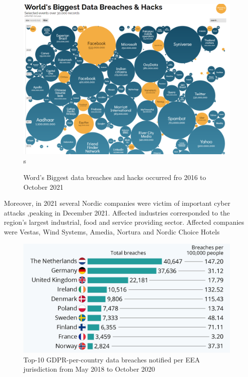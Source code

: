 \begin{figure}[h]
\includegraphics[width=15cm]{img/DataBreach.png}
s\caption{Word's Biggest data breaches and hacks occurred fro 2016 to October 2021  \cite{WorldDataBreach:online}}
\label{fig:worldDataBreach}
\end{figure}
Moreover, in 2021 several Nordic companies were victim of important cyber attacks ,peaking in December 2021\cite{Nordicco81:online}. Affected industries corresponded to the region’s largest industrial, food and  service providing sector.
Affected companies were Vestas, Wind Systems, Amedia, Nortura
and Nordic Choice Hotels

\begin{figure}[h]
\includegraphics[width=15cm]{img/GDPRDataBreach.jpeg}
\centering
\caption{Top-10 \ac{GDPR}-per-country data breaches notified per \ac{EEA} jurisdiction from May 2018 to October 2020\cite{Statista:online}}
\end{figure}

